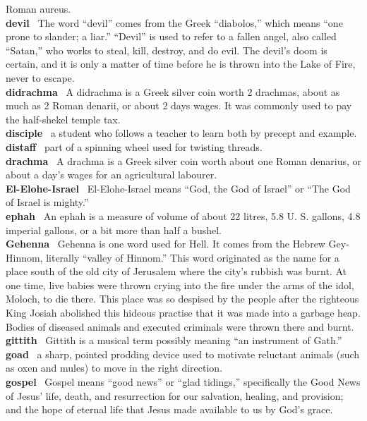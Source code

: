 Roman aureus.\\
\textbf{devil}~ The word ``devil'' comes from the Greek ``diabolos,''
which means ``one prone to slander; a liar.'' ``Devil'' is used to refer
to a fallen angel, also called ``Satan,'' who works to steal, kill,
destroy, and do evil. The devil's doom is certain, and it is only a
matter of time before he is thrown into the Lake of Fire, never to
escape.\\
\textbf{didrachma}~ A didrachma is a Greek silver coin worth 2 drachmas,
about as much as 2 Roman denarii, or about 2 days wages. It was commonly
used to pay the half-shekel temple tax.\\
\textbf{disciple}~ a student who follows a teacher to learn both by
precept and example.\\
\textbf{distaff}~ part of a spinning wheel used for twisting threads.\\
\textbf{drachma}~ A drachma is a Greek silver coin worth about one Roman
denarius, or about a day's wages for an agricultural labourer.\\
\textbf{El-Elohe-Israel}~ El-Elohe-Israel means ``God, the God of
Israel'' or ``The God of Israel is mighty.''\\
\textbf{ephah}~ An ephah is a measure of volume of about 22 litres, 5.8
U. S. gallons, 4.8 imperial gallons, or a bit more than half a bushel.\\
\textbf{Gehenna}~ Gehenna is one word used for Hell. It comes from the
Hebrew Gey-Hinnom, literally ``valley of Hinnom.'' This word originated
as the name for a place south of the old city of Jerusalem where the
city's rubbish was burnt. At one time, live babies were thrown crying
into the fire under the arms of the idol, Moloch, to die there. This
place was so despised by the people after the righteous King Josiah
abolished this hideous practise that it was made into a garbage heap.
Bodies of diseased animals and executed criminals were thrown there and
burnt.\\
\textbf{gittith}~ Gittith is a musical term possibly meaning ``an
instrument of Gath.''\\
\textbf{goad}~ a sharp, pointed prodding device used to motivate
reluctant animals (such as oxen and mules) to move in the right
direction.\\
\textbf{gospel}~ Gospel means ``good news'' or ``glad tidings,''
specifically the Good News of Jesus' life, death, and resurrection for
our salvation, healing, and provision; and the hope of eternal life that
Jesus made available to us by God's grace.\\
